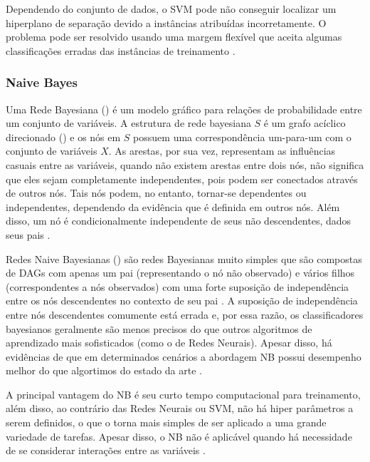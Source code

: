 \documentclass[
	12pt,				%
	oneside,			%
	a4paper,			%
	english,			%
	brazil				%
	]{abntex2ppgsi}
\begin{document}
Dependendo do conjunto de dados, o SVM pode não conseguir localizar um hiperplano de separação devido a instâncias atribuídas incorretamente. O problema pode ser resolvido usando uma margem flexível que aceita algumas classificações erradas das instâncias de treinamento \cite{kotsiantis2006machine}.

\subsubsection{Naive Bayes}

Uma Rede Bayesiana () é um modelo gráfico para relações de probabilidade entre um conjunto de variáveis. A estrutura de rede bayesiana $S$ é um grafo acíclico direcionado () e os nós em $S$ possuem uma correspondência um-para-um com o conjunto de variáveis $X$. As arestas, por sua vez, representam as influências casuais entre as variáveis,
 quando não existem arestas entre dois nós, não significa que eles sejam completamente independentes, pois podem ser conectados através de outros nós. Tais nós podem, no entanto, tornar-se dependentes ou independentes, dependendo da evidência que é definida em outros nós. Além disso, um nó é condicionalmente independente de seus não descendentes, dados seus pais \cite{kotsiantis2006machine}.
 
Redes Naive Bayesianas () são redes Bayesianas muito simples que são compostas de DAGs com apenas um pai (representando o nó não observado) e vários filhos (correspondentes a nós observados) com uma forte suposição de independência entre os nós descendentes no contexto de seu pai \cite{kotsiantis2006machine}.  A suposição de independência entre nós descendentes comumente está errada e, por essa razão, os classificadores bayesianos geralmente são menos precisos do que outros algoritmos de aprendizado mais sofisticados (como o de Redes Neurais). Apesar disso, há evidências de que em determinados cenários a abordagem NB possui desempenho melhor do que algortimos do estado da arte \cite{kotsiantis2006machine}.

A principal vantagem do NB é seu curto tempo computacional para treinamento, além disso, ao contrário das Redes Neurais ou SVM, não há hiper parâmetros a serem definidos, o que o torna mais simples de ser aplicado a uma grande variedade de tarefas. Apesar disso, o NB não é aplicável quando há necessidade de se considerar interações entre as variáveis \cite{kotsiantis2006machine, singh2016review}.
\end{document}
